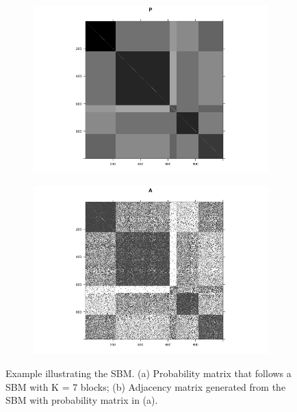 \begin{figure}
\centering
\begin{subfigure}{.5\textwidth}
  \centering
  \includegraphics[width=1.2\linewidth]{SBM_P.png}
\end{subfigure}%
\begin{subfigure}{.5\textwidth}
  \centering
  \includegraphics[width=1.2\linewidth]{SBM_A.png}
\end{subfigure}
\caption{Example illustrating the SBM. (a) Probability matrix that follows a SBM with K = 7 blocks; (b) Adjacency matrix generated from the SBM with probability matrix in (a).}
\label{fig:SBM_example}
\end{figure}




